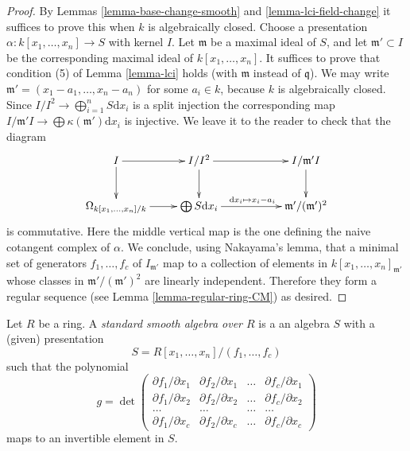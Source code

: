 \begin{proof}
By Lemmas \ref{lemma-base-change-smooth} and
\ref{lemma-lci-field-change} it suffices to prove this when
$k$ is algebraically closed. Choose a presentation
$\alpha : k[x_1, \ldots, x_n] \to S$ with kernel $I$. Let $\mathfrak m$
be a maximal ideal of $S$, and let $\mathfrak m' \subset I$ be the
corresponding maximal ideal of $k[x_1, \ldots, x_n]$.
It suffices to prove that condition (5) of Lemma
\ref{lemma-lci} holds (with $\mathfrak m$ instead of $\mathfrak q$).
We may write $\mathfrak m' = (x_1 - a_1, \ldots, x_n - a_n)$
for some $a_i \in k$, because $k$ is algebraically closed.
Since $I/I^2 \to \bigoplus_{i = 1}^n S \text{d}x_i$
is a split injection the corresponding map
$I/\mathfrak m' I \to \bigoplus \kappa(\mathfrak m') \text{d}x_i$
is injective. We leave it to the reader to check that the diagram
$$
\xymatrix{
I \ar[r] \ar[d] & I/I^2 \ar[rr] \ar[d] & &
I/\mathfrak m'I \ar[d] \\
\Omega_{k[x_1, \ldots, x_n]/k} \ar[r] &
\bigoplus S\text{d}x_i \ar[rr]^{\text{d}x_i \mapsto x_i - a_i} & &
\mathfrak m'/(\mathfrak m')^2
}
$$
is commutative. Here the middle vertical map is the one defining the
naive cotangent complex of $\alpha$.
We conclude, using Nakayama's lemma,
that a minimal set of generators $f_1, \ldots, f_c$
of $I_{\mathfrak m'}$ map to a collection of elements
in $k[x_1, \ldots, x_n]_{\mathfrak m'}$ whose classes in
$\mathfrak m'/(\mathfrak m')^2$ are linearly independent.
Therefore they form a regular sequence (see Lemma \ref{lemma-regular-ring-CM})
as desired.
\end{proof}

\begin{definition}
\label{definition-standard-smooth}
Let $R$ be a ring.
A {\it standard smooth algebra over $R$} is a an algebra
$S$ with a (given) presentation
$$
S = R[x_1, \ldots, x_n]/(f_1, \ldots, f_c)
$$
such that the polynomial
$$
g =
\det 
\left(
\begin{matrix}
\partial f_1/\partial x_1 & 
\partial f_2/\partial x_1 & 
\ldots &
\partial f_c/\partial x_1 \\
\partial f_1/\partial x_2 & 
\partial f_2/\partial x_2 & 
\ldots &
\partial f_c/\partial x_2 \\
\ldots & \ldots & \ldots & \ldots \\
\partial f_1/\partial x_c & 
\partial f_2/\partial x_c & 
\ldots &
\partial f_c/\partial x_c
\end{matrix}
\right)
$$
maps to an invertible element in $S$.
\end{definition}

